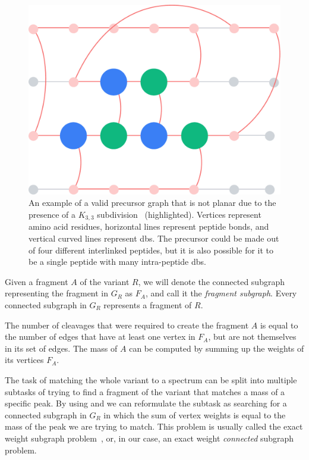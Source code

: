 \begin{figure}
  \centering
  \includegraphics[width=0.5\linewidth]{img/nonplanar.pdf}
  \caption{An example of a valid precursor graph that is not planar due to the presence of a \(K_{3, 3}\) subdivision~\cite{kuratowski1930probleme} (highlighted). Vertices represent amino acid residues, horizontal lines represent peptide bonds, and vertical curved lines represent \glspl*{db}. The precursor could be made out of four different interlinked peptides, but it is also possible for it to be a single peptide with many intra-peptide \glspl*{db}.}\label{fig:nonplanar}
\end{figure}

\begin{defn}\label{defn:fragment}
  Given a fragment \(A\) of the variant \(R\), we will denote the connected subgraph representing the fragment in \(G_R\) as \(F_A\), and call it the \emph{fragment subgraph}. Every connected subgraph in \(G_R\) represents a fragment of \(R\).
\end{defn}

\begin{lemma}\label{lemma:mass}
  The number of cleavages that were required to create the fragment \(A\) is equal to the number of edges that have at least one vertex in \(F_A\), but are not themselves in its set of edges. The mass of \(A\) can be computed by summing up the weights of its vertices \(F_A\).
\end{lemma}

The task of matching the whole variant to a spectrum can be split into multiple subtasks of trying to find a fragment of the variant that matches a mass of a specific peak. By using  and  we can reformulate the subtask as searching for a connected subgraph in \(G_R\) in which the sum of vertex weights is equal to the mass of the peak we are trying to match. This problem is usually called the exact weight subgraph problem~\cite{abboud2013exact}, or, in our case, an exact weight \emph{connected} subgraph problem.


